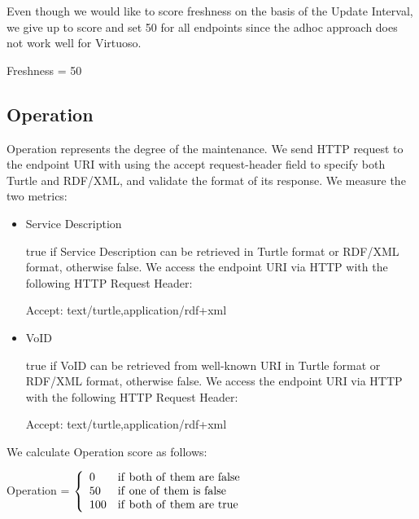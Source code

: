 \documentclass[11pt,a4paper]{article}
\begin{document}
Even though we would like to score freshness on the basis of the Update Interval,
we give up to score and set 50 for all endpoints since the adhoc approach does not work well for Virtuoso.

\begin{mdframed}
  \center
Freshness = 50
\end{mdframed}

\subsection{Operation}

Operation represents the degree of the maintenance.
We send HTTP request to the endpoint URI with using the accept request-header field to specify both Turtle and RDF/XML, and validate the format of its response.
We measure the two metrics:

\begin{itemize}

  \item Service Description

  true if Service Description can be retrieved in Turtle format or RDF/XML format, otherwise false.
  We access the endpoint URI via HTTP with the following HTTP Request Header:

  \begin{mdframed}
    Accept: text/turtle,application/rdf+xml
  \end{mdframed}

  \item VoID

  true if VoID can be retrieved from well-known URI\cite{Alexandar:11:VoID} in Turtle format or RDF/XML format, otherwise false.
  We access the endpoint URI via HTTP with the following HTTP Request Header:

  \begin{mdframed}
    Accept: text/turtle,application/rdf+xml
  \end{mdframed}

\end{itemize}

We calculate Operation score as follows:

\begin{mdframed}
\center
Operation = $\left\{
    \begin{array}{ll}
      0   & {\rm if~both~of~them~are~false } \\
      50  & {\rm if~one~of~them~is~false } \\
      100 & {\rm if~both~of~them~are~true }
  \end{array}
  \right.$
\end{mdframed}
\end{document}

